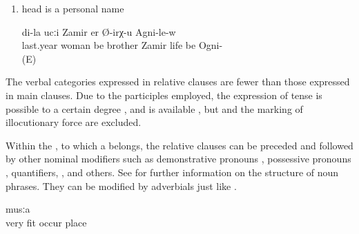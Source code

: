 \begin{enumerate}
	\item	head is a personal name
	\begin{exe}
		\ex	\label{ex:My brother Zamir, who married last year, lives in Ogni}
			di-la	ucːi	Zamir	er	Ø-irχ-u	Agni-le-w\\
			last.year	woman	be		brother	Zamir	life	be	Ogni-\\
		\glt	{} (E)
	\end{exe}
\end{enumerate}

The verbal categories expressed in relative clauses are fewer than those expressed in main clauses. Due to the participles employed, the expression of tense is possible to a certain degree ,  and  is available , but  and the marking of illocutionary force are excluded. 

Within the , to which a  belongs, the relative clauses can be preceded and followed by other nominal modifiers such as demonstrative pronouns , possessive pronouns , quantifiers, , and others. See  for further information on the structure of noun phrases. They can be modified by adverbials just like  .

\begin{exe}
	\ex	\label{ex:‎a very fitting (= good) place}
	\gll	[c'aq'-le	b-al	b-ič-ib]	musːa	\\
		very	fit	occur	place\\
	\glt	\sqt{‎a very fitting (= good) place}
\end{exe}

